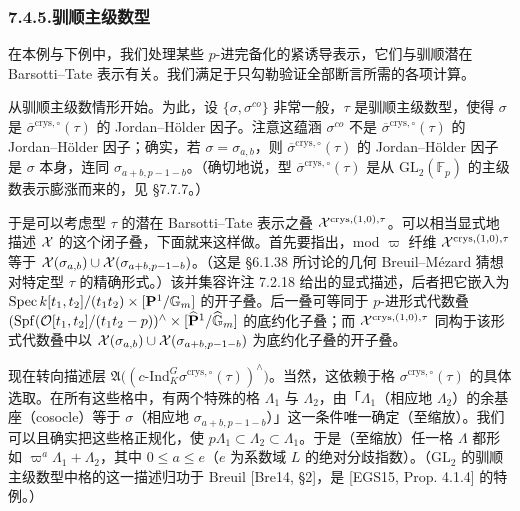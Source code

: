 \subsubsection*{7.4.5.\quad 驯顺主级数型}
在本例与下例中，我们处理某些 $p$-进完备化的紧诱导表示，它们与驯顺潜在 Barsotti--Tate 表示有关。我们满足于只勾勒验证全部断言所需的各项计算。

从驯顺主级数情形开始。为此，设 $\{\sigma,\sigma^{co}\}$ 非常一般，$\tau$ 是驯顺主级数型，使得 $\sigma$ 是 $\overline{\sigma}^{\mathrm{crys},\circ}(\tau)$ 的 Jordan--Hölder 因子。注意这蕴涵 $\sigma^{co}$ 不是 $\overline{\sigma}^{\mathrm{crys},\circ}(\tau)$ 的 Jordan--Hölder 因子；确实，若 $\sigma=\sigma_{a,b}$，则 $\overline{\sigma}^{\mathrm{crys},\circ}(\tau)$ 的 Jordan--Hölder 因子是 $\sigma$ 本身，连同 $\sigma_{a+b,p-1-b}$。（确切地说，型 $\overline{\sigma}^{\mathrm{crys},\circ}(\tau)$ 是从 $\mathrm{GL}_2(\mathbb F_p)$ 的主级数表示膨涨而来的，见 §7.7.7。）

于是可以考虑型 $\tau$ 的潜在 Barsotti--Tate 表示之叠 $\mathcal{X}^{\mathrm{crys},(1,0),\tau}$。可以相当显式地描述 $\mathcal{X}$ 的这个闭子叠，下面就来这样做。首先要指出，mod $\varpi$ 纤维 $\mathcal{X}^{\mathrm{crys},(1,0),\tau}$ 等于 $\mathcal{X}(\sigma_{a,b})\cup\mathcal{X}(\sigma_{a+b,p-1-b})$。（这是 §6.1.38 所讨论的几何 Breuil--Mézard 猜想对特定型 $\tau$ 的精确形式。）该并集容许注 7.2.18 给出的显式描述，后者把它嵌入为 $\operatorname{Spec} k[t_1,t_2]/(t_1t_2)\times[\mathbf P^1/\mathbb G_m]$ 的开子叠。后一叠可等同于 $p$-进形式代数叠 $(\operatorname{Spf}(\mathcal{O}[t_1,t_2]/(t_1t_2-p))^\wedge\times[\widehat{\mathbf P}^1/\widehat{\mathbb G}_m]$ 的底约化子叠；而 $\mathcal{X}^{\mathrm{crys},(1,0),\tau}$ 同构于该形式代数叠中以 $\mathcal{X}(\sigma_{a,b})\cup\mathcal{X}(\sigma_{a+b,p-1-b})$ 为底约化子叠的开子叠。

现在转向描述层 $\mathfrak A\bigl((c\text{-Ind}_K^G\sigma^{\mathrm{crys},\circ}(\tau))^\wedge\bigr)$。当然，这依赖于格 $\sigma^{\mathrm{crys},\circ}(\tau)$ 的具体选取。在所有这些格中，有两个特殊的格 $\Lambda_1$ 与 $\Lambda_2$，由「$\Lambda_1$（相应地 $\Lambda_2$）的余基座（cosocle）等于 $\sigma$（相应地 $\sigma_{a+b,p-1-b}$）」这一条件唯一确定（至缩放）。我们可以且确实把这些格正规化，使 $p\Lambda_1\subset\Lambda_2\subset\Lambda_1$。于是（至缩放）任一格 $\Lambda$ 都形如 $\varpi^a\Lambda_1+\Lambda_2$，其中 $0\le a\le e$（$e$ 为系数域 $L$ 的绝对分歧指数）。（$\mathrm{GL}_2$ 的驯顺主级数型中格的这一描述归功于 Breuil [Bre14, §2]，是 [EGS15, Prop. 4.1.4] 的特例。）

